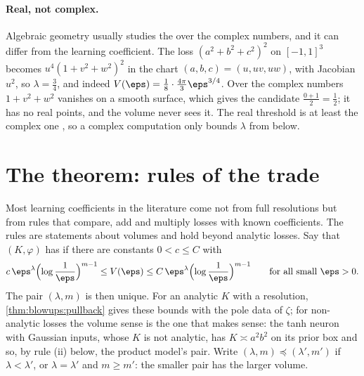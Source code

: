 \begin{refsection}
\paragraph{Real, not complex.} Algebraic geometry usually studies the  over the complex numbers, and it can differ from the learning coefficient. The loss $(a^2+b^2+c^2)^2$ on $[-1,1]^3$ becomes $u^4(1+v^2+w^2)^2$ in the chart $(a,b,c)=(u,uv,uw)$, with Jacobian $u^2$, so $\lambda=\frac34$, and indeed $V(\eps)=\frac18\cdot\frac{4\pi}3\eps^{3/4}$. Over the complex numbers $1+v^2+w^2$ vanishes on a smooth surface, which gives the candidate $\frac{0+1}2=\frac12$; it has no real points, and the volume never sees it. The real threshold is at least the complex one \parencite[Corollary~2]{Saito2007}, so a complex computation only bounds $\lambda$ from below.

\section{The theorem: rules of the trade}\label{sec:blowups:rules}

Most learning coefficients in the literature come not from full resolutions but from rules that compare, add and multiply losses with known coefficients. The rules are statements about volumes and hold beyond analytic losses. Say that $(K,\varphi)$ has  if there are constants $0<c\le C$ with
\[
c\,\eps^\lambda\Bigl(\log\frac1\eps\Bigr)^{m-1}\le V(\eps)\le C\,\eps^\lambda\Bigl(\log\frac1\eps\Bigr)^{m-1}\qquad\text{for all small }\eps>0 .
\]
The pair $(\lambda,m)$ is then unique. For an analytic $K$ with a resolution, \cref{thm:blowups:pullback} gives these bounds with the pole data of $\zeta$; for non-analytic losses the volume sense is the one that makes sense: the tanh neuron with Gaussian inputs, whose $K$ is not analytic, has $K\asymp a^2b^2$ on its prior box and so, by rule (ii) below, the product model's pair. Write $(\lambda,m)\preceq(\lambda',m')$ if $\lambda<\lambda'$, or $\lambda=\lambda'$ and $m\ge m'$: the smaller pair has the larger volume.


\end{refsection}
